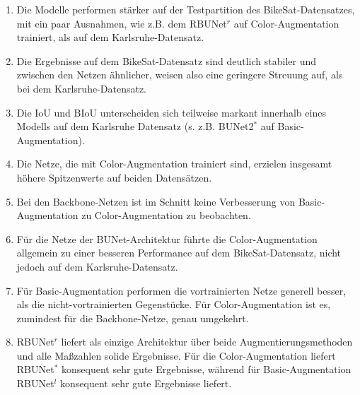 \begin{enumerate}
	\item Die Modelle performen stärker auf der Testpartition des BikeSat-Datensatzes, mit ein paar Ausnahmen, wie z.B. dem RBUNet$^r$ auf Color-Augmentation trainiert, 
	als auf dem Karlsruhe-Datensatz. 
	\item Die Ergebnisse auf dem BikeSat-Datensatz sind deutlich stabiler und zwischen den Netzen ähnlicher, weisen also eine geringere Streuung auf, als bei dem Karlsruhe-Datensatz.
	\item Die \ac{IoU} und \ac{BIoU} unterscheiden sich teilweise markant innerhalb eines Modells auf dem Karlsruhe Datensatz (s. z.B. BUNet2$^*$ auf Basic-Augmentation).
	\item Die Netze, die mit Color-Augmentation trainiert sind, erzielen insgesamt höhere Spitzenwerte auf beiden Datensätzen. 
	\item Bei den Backbone-Netzen ist im Schnitt keine Verbesserung von Basic-Augmentation zu Color-Augmentation zu beobachten. 
	\item Für die Netze der BUNet-Architektur führte die Color-Augmentation allgemein zu einer besseren Performance auf dem BikeSat-Datensatz, nicht jedoch auf dem Karlsruhe-Datensatz.
	\item Für Basic-Augmentation performen die vortrainierten Netze generell besser, als die nicht-vortrainierten Gegenstücke. 
	Für Color-Augmentation ist es, zumindest für die Backbone-Netze, genau umgekehrt. 
	\item RBUNet$^r$ liefert als einzige Architektur über beide Augmentierungsmethoden und alle Maßzahlen solide Ergebnisse. 
	Für die Color-Augmentation liefert RBUNet$^*$ konsequent sehr gute Ergebnisse, während für Basic-Augmentation RBUNet$^l$ konsequent sehr gute Ergebnisse liefert.
\end{enumerate}


